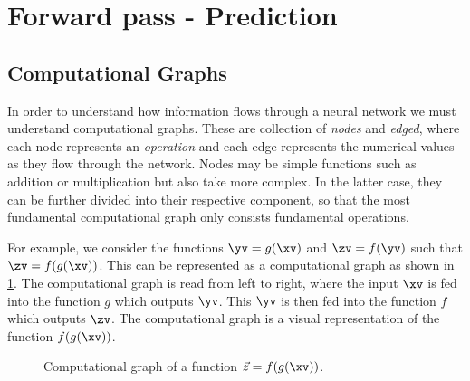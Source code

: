 %
%

\section{Forward pass - Prediction}
    \subsection{Computational Graphs}
    In order to understand how information flows through a neural network we must understand computational graphs. These are collection of \textit{nodes} and \textit{edged}, where each node represents an \textit{operation} and each edge represents the numerical values as they flow through the network. Nodes may be simple functions such as addition or multiplication but also take more complex. In the latter case, they can be further divided into their respective component, so that the most fundamental computational graph only consists fundamental operations. 

    For example, we consider the functions $\yv = g(\xv)$ and $\zv = f(\yv)$ such that $\zv = f(g(\xv))$. This can be represented as a computational graph as shown in \cref{fig:ML:NN:comp_graph_example}. The computational graph is read from left to right, where the input $\xv$ is fed into the function $g$ which outputs $\yv$. This $\yv$ is then fed into the function $f$ which outputs $\zv$. The computational graph is a visual representation of the function $f(g(\xv))$.

    \begin{figure}[h!]
        \centering
        
        \caption{Computational graph of a function $\vec{z} = f(g(\xv))$.}
        \label{fig:ML:NN:comp_graph_example}
    \end{figure}


